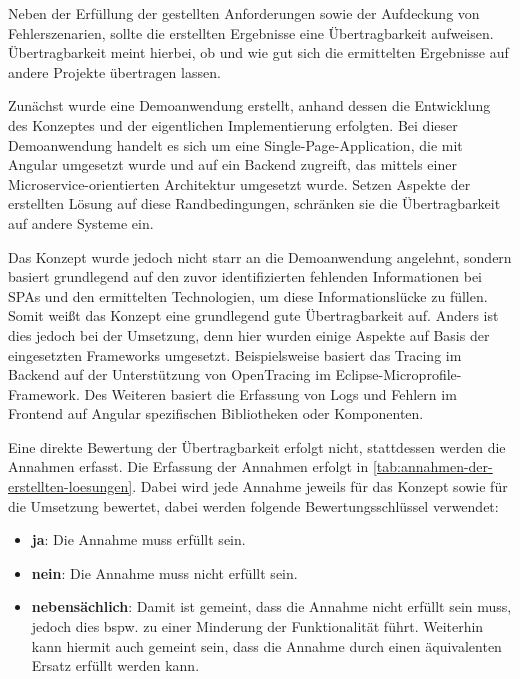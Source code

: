 
Neben der Erfüllung der gestellten Anforderungen sowie der Aufdeckung von Fehlerszenarien, sollte die erstellten Ergebnisse eine Übertragbarkeit aufweisen. Übertragbarkeit meint hierbei, ob und wie gut sich die ermittelten Ergebnisse auf andere Projekte übertragen lassen.

Zunächst wurde eine Demoanwendung erstellt, anhand dessen die Entwicklung des Konzeptes und der eigentlichen Implementierung erfolgten. Bei dieser Demoanwendung handelt es sich um eine Single-Page-Application, die mit Angular umgesetzt wurde und auf ein Backend zugreift, das mittels einer Microservice-orientierten Architektur umgesetzt wurde. Setzen Aspekte der erstellten Lösung auf diese Randbedingungen, schränken sie die Übertragbarkeit auf andere Systeme ein.

Das Konzept wurde jedoch nicht starr an die Demoanwendung angelehnt, sondern basiert grundlegend auf den zuvor identifizierten fehlenden Informationen bei SPAs und den ermittelten Technologien, um diese Informationslücke zu füllen. Somit weißt das Konzept eine grundlegend gute Übertragbarkeit auf. Anders ist dies jedoch bei der Umsetzung, denn hier wurden einige Aspekte auf Basis der eingesetzten Frameworks umgesetzt. Beispielsweise basiert das Tracing im Backend auf der Unterstützung von OpenTracing im Eclipse-Microprofile-Framework. Des Weiteren basiert die Erfassung von Logs und Fehlern im Frontend auf Angular spezifischen Bibliotheken oder Komponenten.

Eine direkte Bewertung der Übertragbarkeit erfolgt nicht, stattdessen werden die Annahmen erfasst. Die Erfassung der Annahmen erfolgt in \autoref{tab:annahmen-der-erstellten-loesungen}. Dabei wird jede Annahme jeweils für das Konzept sowie für die Umsetzung bewertet, dabei werden folgende Bewertungsschlüssel verwendet:

\begin{itemize}
	\item \textbf{ja}: Die Annahme muss erfüllt sein.
	\item \textbf{nein}: Die Annahme muss nicht erfüllt sein.
	\item \textbf{nebensächlich}: Damit ist gemeint, dass die Annahme nicht erfüllt sein muss, jedoch dies bspw. zu einer Minderung der Funktionalität führt. Weiterhin kann hiermit auch gemeint sein, dass die Annahme durch einen äquivalenten Ersatz erfüllt werden kann.
\end{itemize}


